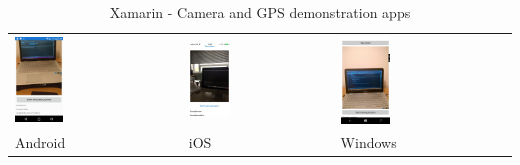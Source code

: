 \documentclass[english,master,public,dept460,male,cpdeclaration,oneside]{diploma}
\begin{document}
\begin{table}[!h]
	\centering
	\caption{Xamarin - Camera and GPS demonstration apps}
	\label{table:uis}
	\begin{tabular}{p{5cm} | p{5cm} | p{5cm} }
		\toprule		
		\includegraphics[width=0.3\textwidth]{Figures/xamarin3android.PNG}
		& \includegraphics[width=0.3\textwidth]{Figures/xamarin3ios.jpg}
		& \includegraphics[width=0.3\textwidth]{Figures/xamarin3windows.PNG}
		\\
		Android & iOS & Windows \\
		\midrule
	\end{tabular}
\end{table}
\end{document}
